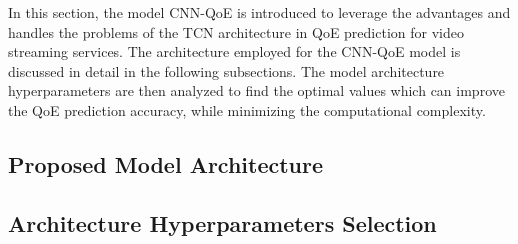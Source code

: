 In this section, the model CNN-QoE is introduced to leverage the advantages and handles the problems of the TCN architecture \cite{Network_TCN} in QoE prediction for video streaming services.
The architecture employed for the CNN-QoE model is discussed in detail in the following subsections.
The model architecture hyperparameters are then analyzed to find the optimal values which can improve the QoE prediction accuracy, while minimizing the computational complexity.


\subsection{Proposed Model Architecture}
\label{sec:ProposedModel_Architecture}


\subsection{Architecture Hyperparameters Selection}
\label{sec:ProposedModel_Parameters}
